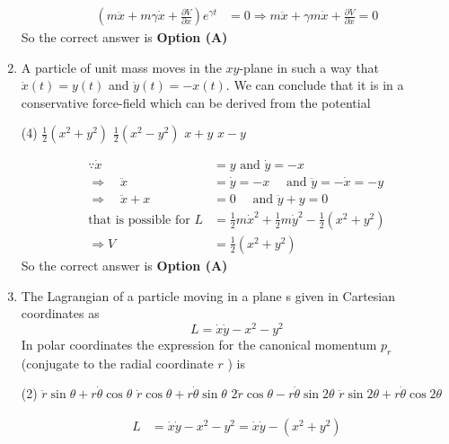 \begin{enumerate}
\begin{answer}
\begin{align*}
	\left(m \ddot{x}+m \gamma \dot{x}+\frac{\partial V}{\partial x}\right) e^{\gamma t}&=0 \Rightarrow m \ddot{x}+\gamma m \dot{x}+\frac{\partial V}{\partial x}=0
	\end{align*}
	So the correct answer is \textbf{Option (A)}
\end{answer}
	\item A particle of unit mass moves in the $x y$-plane in such a way that $\dot{x}(t)=y(t)$ and $\dot{y}(t)=-x(t) .$ We can conclude that it is in a conservative force-field which can be derived from the potential
	{}
	\begin{tasks}(4)
		\task[\textbf{A.}] $\frac{1}{2}\left(x^{2}+y^{2}\right)$
		\task[\textbf{B.}] $\frac{1}{2}\left(x^{2}-y^{2}\right)$
		\task[\textbf{C.}] $x+y$
		\task[\textbf{D.}] $x-y$
	\end{tasks}	
\begin{answer}
	\begin{align*}
	\because \dot{x}&=y\text{ and }\dot{y}=-x\\
	\Rightarrow \quad \ddot{x}&=\dot{y}=-x \quad\text{ and }\ddot{y}=-\dot{x}=-y\\
	\Rightarrow \quad \ddot{x}+x&=0 \quad\text{ and }\ddot{y}+y=0\\
	\text{that is possible for }L&=\frac{1}{2} m \dot{x}^{2}+\frac{1}{2} m \dot{y}^{2}-\frac{1}{2}\left(x^{2}+y^{2}\right) \\\Rightarrow V&=\frac{1}{2}\left(x^{2}+y^{2}\right)
	\end{align*}
	So the correct answer is \textbf{Option (A)}
\end{answer}
	\item The Lagrangian of a particle moving in a plane s given in Cartesian coordinates as
	$$
	L=\dot{x} \dot{y}-x^{2}-y^{2}
	$$
	In polar coordinates the expression for the canonical momentum $p_{r}$ (conjugate to the radial coordinate $r$ ) is
	{}
	\begin{tasks}(2)
		\task[\textbf{A.}] $\dot{r} \sin \theta+r \dot{\theta} \cos \theta$
		\task[\textbf{B.}]  $\dot{r} \cos \theta+r \dot{\theta} \sin \theta$
		\task[\textbf{C.}] $2 \dot{r} \cos \theta-r \dot{\theta} \sin 2 \theta$
		\task[\textbf{D.}] $\dot{r} \sin 2 \theta+r \dot{\theta} \cos 2 \theta$
	\end{tasks}
\begin{answer}
	\begin{align*}
	L&=\dot{x} \dot{y}-x^{2}-y^{2}=\dot{x} \dot{y}-\left(x^{2}+y^{2}\right)\\

\end{align*}
\end{answer}
\end{enumerate}

